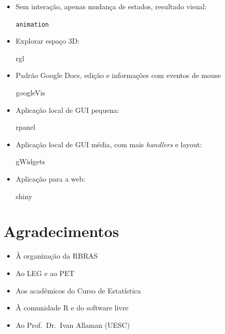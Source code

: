 \begin{frame}

  \begin{multicols}{2}
    \begin{itemize}
    \pause \item Sem interação, apenas mudança de estados, resultado visual:
      \pause
      \begin{center}
        \texttt{animation}
      \end{center}
    \pause \item Explorar espaço 3D: \pause
      \begin{center}
        rgl
      \end{center}
      \pause \item Padrão Google Docs, edição e informações com eventos
      de mouse \pause
      \begin{center}
        googleVis
      \end{center}
      \vfill \columnbreak
    \pause \item Aplicação local de GUI pequena: \pause
      \begin{center}
        rpanel
      \end{center}
    \pause \item Aplicação local de GUI média, com mais \textit{handlers} e
      layout: \pause
      \begin{center}
        gWidgets
      \end{center}
    \pause \item Aplicação para a web: \pause
      \begin{center}
        shiny
      \end{center}
    \end{itemize}
  \end{multicols}

\end{frame}

\section{Agradecimentos}

\begin{frame}

  \begin{itemize}
  \item À organização da RBRAS
  \item Ao LEG e ao PET
  \item Aos acadêmicos do Curso de Estatística
  \item À comunidade R e do software livre
  \item Ao Prof.~Dr.~Ivan Allaman (UESC)
  \end{itemize}

\end{frame}

